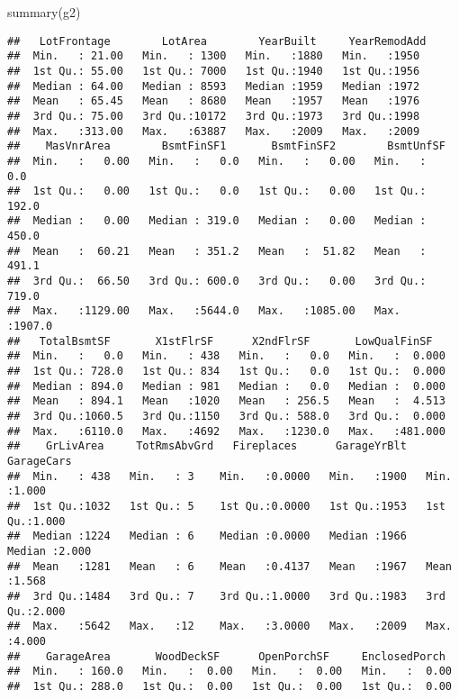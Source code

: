 \documentclass[
]{article}
\newenvironment{Shaded}{\begin{snugshade}}{\end{snugshade}}
\newcommand{\FunctionTok}[1]{\textcolor[rgb]{0.00,0.00,0.00}{#1}}
\newcommand{\NormalTok}[1]{#1}
\begin{document}
\begin{Shaded}
\begin{Highlighting}[]
\FunctionTok{summary}\NormalTok{(g2)}
\end{Highlighting}
\end{Shaded}

\begin{verbatim}
##   LotFrontage        LotArea        YearBuilt     YearRemodAdd 
##  Min.   : 21.00   Min.   : 1300   Min.   :1880   Min.   :1950  
##  1st Qu.: 55.00   1st Qu.: 7000   1st Qu.:1940   1st Qu.:1956  
##  Median : 64.00   Median : 8593   Median :1959   Median :1972  
##  Mean   : 65.45   Mean   : 8680   Mean   :1957   Mean   :1976  
##  3rd Qu.: 75.00   3rd Qu.:10172   3rd Qu.:1973   3rd Qu.:1998  
##  Max.   :313.00   Max.   :63887   Max.   :2009   Max.   :2009  
##    MasVnrArea        BsmtFinSF1       BsmtFinSF2        BsmtUnfSF     
##  Min.   :   0.00   Min.   :   0.0   Min.   :   0.00   Min.   :   0.0  
##  1st Qu.:   0.00   1st Qu.:   0.0   1st Qu.:   0.00   1st Qu.: 192.0  
##  Median :   0.00   Median : 319.0   Median :   0.00   Median : 450.0  
##  Mean   :  60.21   Mean   : 351.2   Mean   :  51.82   Mean   : 491.1  
##  3rd Qu.:  66.50   3rd Qu.: 600.0   3rd Qu.:   0.00   3rd Qu.: 719.0  
##  Max.   :1129.00   Max.   :5644.0   Max.   :1085.00   Max.   :1907.0  
##   TotalBsmtSF       X1stFlrSF      X2ndFlrSF       LowQualFinSF    
##  Min.   :   0.0   Min.   : 438   Min.   :   0.0   Min.   :  0.000  
##  1st Qu.: 728.0   1st Qu.: 834   1st Qu.:   0.0   1st Qu.:  0.000  
##  Median : 894.0   Median : 981   Median :   0.0   Median :  0.000  
##  Mean   : 894.1   Mean   :1020   Mean   : 256.5   Mean   :  4.513  
##  3rd Qu.:1060.5   3rd Qu.:1150   3rd Qu.: 588.0   3rd Qu.:  0.000  
##  Max.   :6110.0   Max.   :4692   Max.   :1230.0   Max.   :481.000  
##    GrLivArea     TotRmsAbvGrd   Fireplaces      GarageYrBlt     GarageCars   
##  Min.   : 438   Min.   : 3    Min.   :0.0000   Min.   :1900   Min.   :1.000  
##  1st Qu.:1032   1st Qu.: 5    1st Qu.:0.0000   1st Qu.:1953   1st Qu.:1.000  
##  Median :1224   Median : 6    Median :0.0000   Median :1966   Median :2.000  
##  Mean   :1281   Mean   : 6    Mean   :0.4137   Mean   :1967   Mean   :1.568  
##  3rd Qu.:1484   3rd Qu.: 7    3rd Qu.:1.0000   3rd Qu.:1983   3rd Qu.:2.000  
##  Max.   :5642   Max.   :12    Max.   :3.0000   Max.   :2009   Max.   :4.000  
##    GarageArea       WoodDeckSF      OpenPorchSF     EnclosedPorch   
##  Min.   : 160.0   Min.   :  0.00   Min.   :  0.00   Min.   :  0.00  
##  1st Qu.: 288.0   1st Qu.:  0.00   1st Qu.:  0.00   1st Qu.:  0.00  

\end{verbatim}
\end{document}
